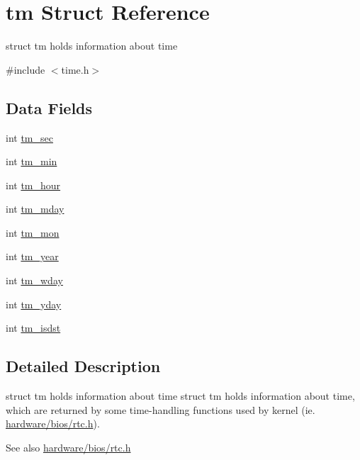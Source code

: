 \hypertarget{structtm}{
\section{tm Struct Reference}
\label{structtm}
}


struct tm holds information about time  




{\ttfamily \#include $<$time.h$>$}

\subsection*{Data Fields}
\begin{DoxyCompactItemize}
\item 
int \hyperlink{structtm_a4d098a9a5c03a00b2ee61e10851de81e}{tm\_\-sec}
\item 
int \hyperlink{structtm_af414eb7c86cc3099595211eee4d4211b}{tm\_\-min}
\item 
int \hyperlink{structtm_a3e7ca4e37f1abcaf56b8a916c38eb9fe}{tm\_\-hour}
\item 
int \hyperlink{structtm_ab8d8904bad43b0c8b96e61941c5b5310}{tm\_\-mday}
\item 
int \hyperlink{structtm_a112ac36fa2f593777138a417cf031e17}{tm\_\-mon}
\item 
int \hyperlink{structtm_a33adf78fd6476b2120ce3b9c4a852053}{tm\_\-year}
\item 
int \hyperlink{structtm_afe81a8c46f1c693c43f259b288859f4f}{tm\_\-wday}
\item 
int \hyperlink{structtm_a93a0ba77cc23796df84405dcbcc57eb1}{tm\_\-yday}
\item 
int \hyperlink{structtm_a5645ca0580c8ab2c24f6c2965d9c9f9c}{tm\_\-isdst}
\end{DoxyCompactItemize}


\subsection{Detailed Description}
struct tm holds information about time struct tm holds information about time, which are returned by some time-\/handling functions used by kernel (ie. \hyperlink{rtc_8h_source}{hardware/bios/rtc.h}).

\begin{DoxySeeAlso}{See also}
\hyperlink{rtc_8h_source}{hardware/bios/rtc.h} 
\end{DoxySeeAlso}


